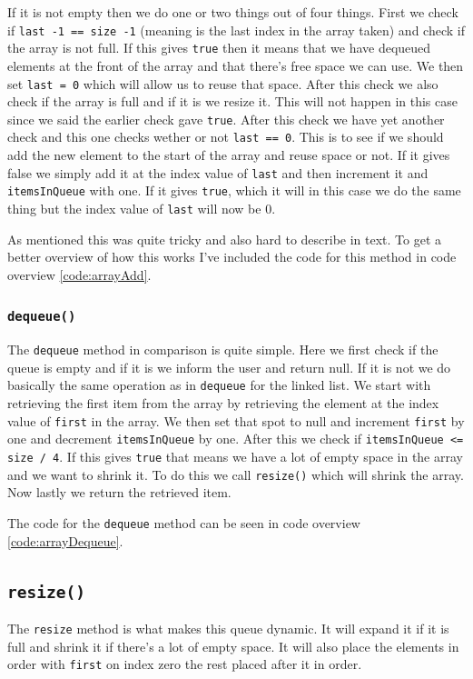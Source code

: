 \documentclass[a4paper,11pt]{article}
\begin{document}
If it is not empty then we do one or two things out of four things. First we check if {\tt last -1 == size -1}
(meaning is the last index in the array taken) and check if the array is not full. If this gives {\tt true} then it
means that we have dequeued elements at the front of the array and that there's free space we can use. We then set
    {\tt last = 0} which will allow us to reuse that space. After this check we also check if the array is full and
if it is we resize it. This will not happen in this case since we said the earlier check gave {\tt true}. After
this check we have yet another check and this one checks wether or not {\tt last == 0}. This is to see if we should
add the new element to the start of the array and reuse space or not. If it gives false we simply add it at the
index value of {\tt last} and then increment it and {\tt itemsInQueue} with one.  If it gives {\tt true}, which it will
in this case we do the same thing but the index value of {\tt last} will now be $0$.

As mentioned this was quite tricky and also hard to describe in text. To get a better overview of how this works I've
included the code for this method in code overview \ref{code:arrayAdd}.

\subsubsection{{\tt dequeue()}}
\label{metmet-dequeue}
The {\tt dequeue} method in comparison is quite simple. Here we first check if the queue is empty and if it is we inform
the user and return null. If it is not we do basically the same operation as in {\tt dequeue} for the linked list. We
start with retrieving the first item from the array by retrieving the element at the index value of {\tt first} in
the array. We then set that spot to null and increment {\tt first} by one and decrement {\tt itemsInQueue} by one.
After this we check if {\tt itemsInQueue <= size / 4}. If this gives {\tt true} that means we have a lot of empty space
in the array and we want to shrink it. To do this we call {\tt resize()} which will shrink the array. Now lastly we
return the retrieved item.

The code for the {\tt dequeue} method can be seen in code overview \ref{code:arrayDequeue}.

\subsection{{\tt resize()}}
\label{metmet-resize}
The {\tt resize} method is what makes this queue dynamic. It will expand it if it is full and shrink it if there's
a lot of empty space. It will also place the elements in order with {\tt first} on index zero the rest placed after it
in order.
\end{document}
